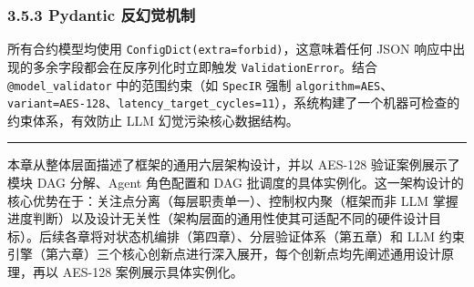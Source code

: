 \subsubsection{3.5.3 Pydantic
反幻觉机制}\label{pydantic-ux53cdux5e7bux89c9ux673aux5236}

所有合约模型均使用
\texttt{ConfigDict(extra=\textquotesingle{}forbid\textquotesingle{})}，这意味着任何
JSON 响应中出现的多余字段都会在反序列化时立即触发
\texttt{ValidationError}。结合 \texttt{@model\_validator}
中的范围约束（如 \texttt{SpecIR} 强制
\texttt{algorithm=\textquotesingle{}AES\textquotesingle{}}、\texttt{variant=\textquotesingle{}AES-128\textquotesingle{}}、\texttt{latency\_target\_cycles=11}），系统构建了一个机器可检查的约束体系，有效防止
LLM 幻觉污染核心数据结构。

\begin{center}\rule{0.5\linewidth}{0.5pt}\end{center}

本章从整体层面描述了框架的通用六层架构设计，并以 AES-128
验证案例展示了模块 DAG 分解、Agent 角色配置和 DAG
批调度的具体实例化。这一架构设计的核心优势在于：关注点分离（每层职责单一）、控制权内聚（框架而非
LLM
掌握进度判断）以及设计无关性（架构层面的通用性使其可适配不同的硬件设计目标）。后续各章将对状态机编排（第四章）、分层验证体系（第五章）和
LLM
约束引擎（第六章）三个核心创新点进行深入展开，每个创新点均先阐述通用设计原理，再以
AES-128 案例展示具体实例化。

